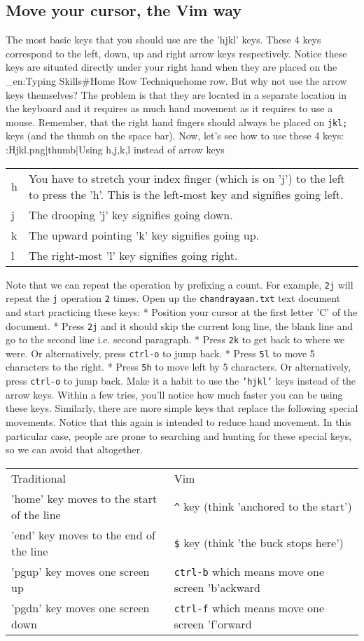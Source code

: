 \subsection{Move your cursor, the Vim way}
The most basic keys that you should use are the 'hjkl' keys. These 4 keys
correspond to the left, down, up and right arrow keys respectively. Notice
these keys are situated directly under your right hand when they are placed on
the \_en:Typing Skills\#Home Row Techniquehome row. But why not use the arrow
keys themselves? The problem is that they are located in a separate location in
the keyboard and it requires as much hand movement as it requires to use a
mouse. Remember, that the right hand fingers should always be placed on
\texttt{jkl;} keys (and the thumb on the space bar). Now, let's see how to use
these 4 keys: :Hjkl.png|thumb|Using h,j,k,l instead of arrow keys
\begin{tabular}{l p{5.8cm}} \hline
h & You have to stretch your index finger (which is on 'j') to the left to press the 'h'. This is the left-most key and signifies going left. \\  
j & The drooping 'j' key signifies going down. \\ 
k & The upward pointing 'k' key signifies going up. \\ 
l & The right-most 'l' key signifies going right. \\ \hline
\end{tabular} 
Note that we can repeat the operation
by prefixing a count. For example, \texttt{2j} will repeat the \texttt{j}
operation \texttt{2} times. Open up the \texttt{chandrayaan.txt} text document
and start practicing these keys: * Position your cursor at the first letter 'C'
of the document. * Press \texttt{2j} and it should skip the current long line,
the blank line and go to the second line i.e. second paragraph. * Press
\texttt{2k} to get back to where we were. Or alternatively, press
\texttt{ctrl-o} to jump back. * Press \texttt{5l} to move 5 characters to the
right. * Press \texttt{5h} to move left by 5 characters. Or alternatively,
press \texttt{ctrl-o} to jump back. Make it a habit to use the \texttt{'hjkl'}
keys instead of the arrow keys. Within a few tries, you'll notice how much
faster you can be using these keys. Similarly, there are more simple keys that
replace the following special movements. Notice that this again is intended to
reduce hand movement. In this particular case, people are prone to searching
and hunting for these special keys, so we can avoid that altogether.
\begin{tabular}{p{3cm} p{3cm}} \hline 
Traditional & Vim \\  
'home' key moves to the start of the line & \texttt{\^} key (think 'anchored to the start') \\ 
'end' key moves to the end of the line & \texttt{\$} key (think 'the buck stops here') \\ 
'pgup' key moves one screen up & \texttt{ctrl-b} which means move one screen 'b'ackward \\  
'pgdn' key moves one screen down & \texttt{ctrl-f} which means move one screen 'f'orward \\ \hline
\end{tabular} 
